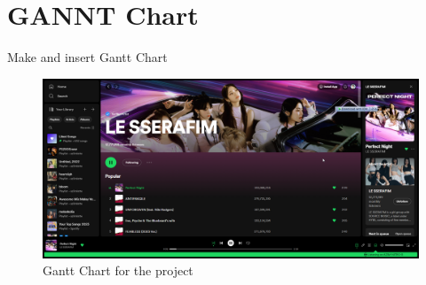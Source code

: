 \chapter{GANNT Chart}
\label{app:data}
Make and insert Gantt Chart
\begin{figure}[h]
    \centering
    \includegraphics[width=1.0\linewidth]{mainmatter/images/musicplat2.png}
    \caption{Gantt Chart for the project}
    \label{fig:myfig40}
\end{figure}